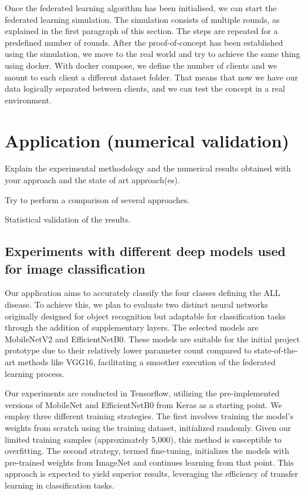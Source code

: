 \documentclass[runningheads,a4paper,11pt]{report}
\begin{document}
Once the federated learning algorithm has been initialised, we can start the federated learning simulation. The simulation consists of multiple rounds, as explained in the first paragraph of this section. The steps are repeated for a predefined number of rounds. After the proof-of-concept has been established using the simulation, we move to the real world and try to achieve the same thing using docker. With docker compose, we define the number of clients and we mount to each client a different dataset folder. That means that now we have our data logically separated between clients, and we can test the concept in a real environment.


\chapter{Application (numerical validation)}
\label{chapter:application}

Explain the experimental methodology and the numerical results obtained with your approach and the state of art approach(es).

Try to perform a comparison of several approaches.

Statistical validation of the results.

\section{Experiments with different deep models used for image classification}

Our application aims to accurately classify the four classes defining the ALL disease. To achieve this, we plan to evaluate two distinct neural networks originally designed for object recognition but adaptable for classification tasks through the addition of supplementary layers. The selected models are MobileNetV2 and EfficientNetB0. These models are suitable for the initial project prototype due to their relatively lower parameter count compared to state-of-the-art methods like VGG16, facilitating a smoother execution of the federated learning process.

Our experiments are conducted in Tensorflow, utilizing the pre-implemented versions of MobileNet and EfficientNetB0 from Keras as a starting point. We employ three different training strategies. The first involves training the model's weights from scratch using the training dataset, initialized randomly. Given our limited training samples (approximately 5,000), this method is susceptible to overfitting. The second strategy, termed fine-tuning, initializes the models with pre-trained weights from ImageNet and continues learning from that point. This approach is expected to yield superior results, leveraging the efficiency of transfer learning in classification tasks.
\end{document}
